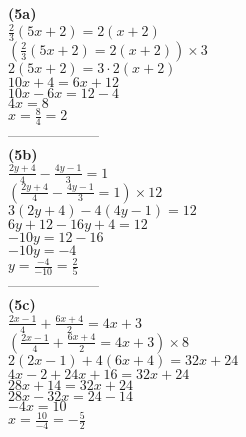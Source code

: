 \documentclass[11pt,a4paper]{article}
\begin{document}
\begin{flushleft}
\begin{minipage}{6cm}
{\bf (5a)}\\
$\frac{2}{3}(5x+2)=2(x+2)$\\
$\left(\frac{2}{3}(5x+2)=2(x+2)\right)\times 3$\\
$2(5x+2)=3\cdot 2(x+2)$\\
$10x+4=6x+12$\\
$10x-6x=12-4$\\
$4x=8$\\
$x=\frac{8}{4}=2$\\
{\color{blue} --------------------}\\
{\bf (5b)}\\
$\frac{2y+4}{4}-\frac{4y-1}{3}=1$\\
$\left(\frac{2y+4}{4}-\frac{4y-1}{3}=1\right)\times 12$\\
$3(2y+4)-4(4y-1)=12$\\
$6y+12-16y+4=12$\\
$-10y=12-16$\\
$-10y=-4$\\
$y=\frac{-4}{-10}=\frac{2}{5}$\\
{\color{blue} --------------------}\\
{\bf (5c)}\\
$\frac{2x-1}{4}+\frac{6x+4}{2}=4x+3$\\
$\left(\frac{2x-1}{4}+\frac{6x+4}{2}=4x+3\right)\times 8$\\
$2(2x-1)+4(6x+4)=32x+24$\\
$4x-2+24x+16=32x+24$\\
$28x+14=32x+24$\\
$28x-32x=24-14$\\
$-4x=10$\\
$x=\frac{10}{-4}=-\frac{5}{2}$\\
\end{minipage}
\end{flushleft}
\end{document}
